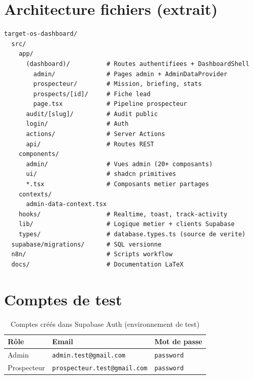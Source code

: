 \documentclass[11pt,a4paper]{report}
\begin{document}
\chapter{Architecture fichiers (extrait)}

\begin{lstlisting}
target-os-dashboard/
  src/
    app/
      (dashboard)/          # Routes authentifiees + DashboardShell
        admin/              # Pages admin + AdminDataProvider
        prospecteur/        # Mission, briefing, stats
        prospects/[id]/     # Fiche lead
        page.tsx            # Pipeline prospecteur
      audit/[slug]/         # Audit public
      login/                # Auth
      actions/              # Server Actions
      api/                  # Routes REST
    components/
      admin/                # Vues admin (20+ composants)
      ui/                   # shadcn primitives
      *.tsx                 # Composants metier partages
    contexts/
      admin-data-context.tsx
    hooks/                  # Realtime, toast, track-activity
    lib/                    # Logique metier + clients Supabase
    types/                  # database.types.ts (source de verite)
  supabase/migrations/      # SQL versionne
  n8n/                      # Scripts workflow
  docs/                     # Documentation LaTeX
\end{lstlisting}

\chapter{Comptes de test}

\begin{table}[h]
\centering
\begin{tabular}{@{}lll@{}}
\toprule
\textbf{Rôle} & \textbf{Email} & \textbf{Mot de passe} \\
\midrule
Admin & \texttt{admin.test@gmail.com} & \texttt{password} \\
Prospecteur & \texttt{prospecteur.test@gmail.com} & \texttt{password} \\
\bottomrule
\end{tabular}
\caption{Comptes créés dans Supabase Auth (environnement de test)}
\end{table}

\end{document}
